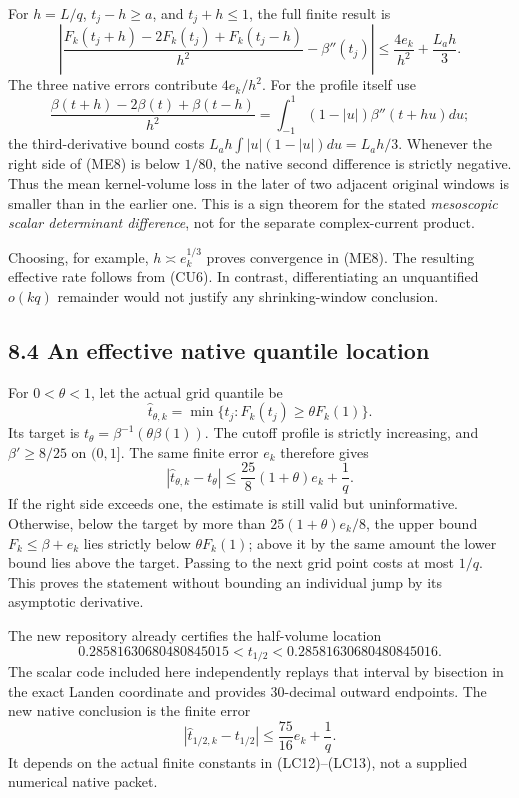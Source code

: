 \documentclass[10pt]{article}
\begin{document}
For \(h=L/q\), \(t_j-h\ge a\), and \(t_j+h\le1\), the full finite result is \[
 \boxed{
 \left|\frac{F_k(t_j+h)-2F_k(t_j)+F_k(t_j-h)}{h^2}
 -\beta''(t_j)\right|
 \le\frac{4e_k}{h^2}+\frac{L_a h}{3}.}
 \tag{ME8}
\] The three native errors contribute \(4e_k/h^2\). For the profile itself use \[
 \frac{\beta(t+h)-2\beta(t)+\beta(t-h)}{h^2}
 =\int_{-1}^{1}(1-|u|)\beta''(t+hu)du;
\] the third-derivative bound costs \(L_ah\int|u|(1-|u|)du=L_ah/3\). Whenever the right side of (ME8) is below \(1/80\), the native second difference is strictly negative. Thus the mean kernel-volume loss in the later of two adjacent original windows is smaller than in the earlier one. This is a sign theorem for the stated \emph{mesoscopic scalar determinant difference}, not for the separate complex-current product.

Choosing, for example, \(h\asymp e_k^{1/3}\) proves convergence in (ME8). The resulting effective rate follows from (CU6). In contrast, differentiating an unquantified \(o(kq)\) remainder would not justify any shrinking-window conclusion.

\subsection{8.4 An effective native quantile location}\label{an-effective-native-quantile-location}

For \(0<\theta<1\), let the actual grid quantile be \[
 \widehat t_{\theta,k}=\min\{t_j:F_k(t_j)\ge\theta F_k(1)\}.
\] Its target is \(t_\theta=\beta^{-1}(\theta\beta(1))\). The cutoff profile is strictly increasing, and \(\beta'\ge8/25\) on \((0,1]\). The same finite error \(e_k\) therefore gives \[
 \boxed{|\widehat t_{\theta,k}-t_\theta|
 \le\frac{25}{8}(1+\theta)e_k+\frac1q.}
 \tag{ME9}
\] If the right side exceeds one, the estimate is still valid but uninformative. Otherwise, below the target by more than \(25(1+\theta)e_k/8\), the upper bound \(F_k\le\beta+e_k\) lies strictly below \(\theta F_k(1)\); above it by the same amount the lower bound lies above the target. Passing to the next grid point costs at most \(1/q\). This proves the statement without bounding an individual jump by its asymptotic derivative.

The new repository already certifies the half-volume location \[
0.28581630680480845015<t_{1/2}<0.28581630680480845016.
\] The scalar code included here independently replays that interval by bisection in the exact Landen coordinate and provides 30-decimal outward endpoints. The new native conclusion is the finite error \[
 \boxed{|\widehat t_{1/2,k}-t_{1/2}|\le\frac{75}{16}e_k+\frac1q.}
 \tag{ME10}
\] It depends on the actual finite constants in (LC12)--(LC13), not a supplied numerical native packet.
\end{document}
